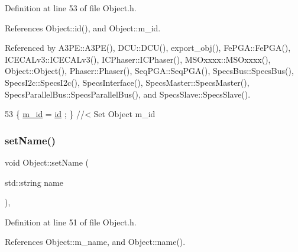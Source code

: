 Definition at line 53 of file Object.\+h.



References Object\+::id(), and Object\+::m\+\_\+id.



Referenced by A3\+P\+E\+::\+A3\+P\+E(), D\+C\+U\+::\+D\+C\+U(), export\+\_\+obj(), Fe\+P\+G\+A\+::\+Fe\+P\+G\+A(), I\+C\+E\+C\+A\+Lv3\+::\+I\+C\+E\+C\+A\+Lv3(), I\+C\+Phaser\+::\+I\+C\+Phaser(), M\+S\+Oxxxx\+::\+M\+S\+Oxxxx(), Object\+::\+Object(), Phaser\+::\+Phaser(), Seq\+P\+G\+A\+::\+Seq\+P\+G\+A(), Specs\+Bus\+::\+Specs\+Bus(), Specs\+I2c\+::\+Specs\+I2c(), Specs\+Interface(), Specs\+Master\+::\+Specs\+Master(), Specs\+Parallel\+Bus\+::\+Specs\+Parallel\+Bus(), and Specs\+Slave\+::\+Specs\+Slave().


\begin{DoxyCode}
53 \{ \hyperlink{classObject_aca74b9dbfed7b5556ea2d56c65b6b6b0}{m\_id}    = \hyperlink{classObject_af99145335cc61ff6e2798ea17db009d2}{id}    ; \} \textcolor{comment}{//< Set Object m\_id}
\end{DoxyCode}
\mbox{\label{classObject_ae30fea75683c2d149b6b6d17c09ecd0c}} 
\subsubsection{\texorpdfstring{set\+Name()}{setName()}}
{\footnotesize\ttfamily void Object\+::set\+Name (\begin{DoxyParamCaption}\item[{std\+::string}]{name }\end{DoxyParamCaption})\hspace{0.3cm}{\ttfamily [inline]}, {\ttfamily [inherited]}}



Definition at line 51 of file Object.\+h.



References Object\+::m\+\_\+name, and Object\+::name().



